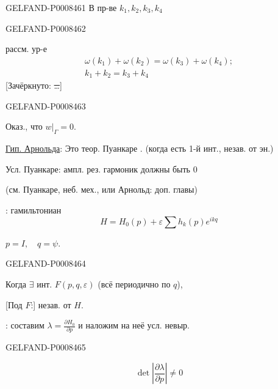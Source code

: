 \begin{GelfandAdjacentEvidence}{GELFAND-P000846}{1}
В пр-ве \(k_1,k_2,k_3,k_4\)
\end{GelfandAdjacentEvidence}
\begin{GelfandAdjacentEvidence}{GELFAND-P000846}{2}


рассм. ур-е
\[
\begin{gathered}
\omega(k_1)+\omega(k_2)=\omega(k_3)+\omega(k_4);\\
k_1+k_2=k_3+k_4
\end{gathered}
\]
[Зачёркнуто: \sout{…}]
\end{GelfandAdjacentEvidence}
\begin{GelfandAdjacentEvidence}{GELFAND-P000846}{3}


Оказ., что \(w|_\Gamma=0\).

\uline{Гип. Арнольда}: Это теор. Пуанкаре . (когда есть 1-й инт., незав. от эн.)

Усл. Пуанкаре: ампл. рез. гармоник должны быть \(0\)

(см. Пуанкаре, неб. мех., или Арнольд: доп. главы)

: гамильтониан
\[
H=H_0(p)+\varepsilon\sum h_k(p)e^{ikq}
\]

\(p=I,\quad q=\psi\).
\end{GelfandAdjacentEvidence}
\begin{GelfandAdjacentEvidence}{GELFAND-P000846}{4}


Когда \(\exists\) инт. \(F(p,q,\varepsilon)\) (всё периодично по \(q\)),

[Под \(F\):] незав. от \(H\).

: составим \(\lambda=\frac{\partial H_0}{\partial p}\) и наложим на неё усл. невыр.
\end{GelfandAdjacentEvidence}
\begin{GelfandAdjacentEvidence}{GELFAND-P000846}{5}


\[
\det\left|\frac{\partial\lambda}{\partial p}\right|\ne0
\]
\end{GelfandAdjacentEvidence}
